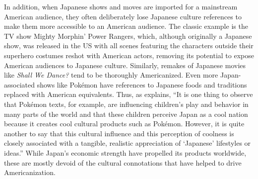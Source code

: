 \documentclass[12pt]{article}
\begin{document}
In addition, when Japanese shows and moves are imported for a mainstream American audience, they often deliberately lose Japanese culture references to make them more accessible to an American audience.  The classic example is the TV show Mighty Morphin' Power Rangers, which, although originally a Japanese show, was released in the US with all scenes featuring the characters outside their superhero costumes reshot with American actors, removing its potential to expose American audiences to Japanese culture.  Similarly, remakes of Japanese movies like \emph{Shall We Dance?} tend to be thoroughly Americanized.  Even more Japan-associated shows like Pok\'emon have references to Japanese foods and traditions replaced with American equivalents.  Thus, as \cRecentering{\citet[pg.\ 34]} explains, ``It is one thing to observe that Pok\'emon texts, for example, are influencing children's play and behavior in many parts of the world and that these children perceive Japan as a cool nation because it creates cool cultural products such as Pok\'emon.  However, it is quite another to say that this cultural influence and this perception of coolness is closely associated with a tangible, realistic appreciation of `Japanese' lifestyles or ideas.''  While Japan's economic strength have propelled its products worldwide, these are mostly devoid of the cultural connotations that have helped to drive Americanization.
\end{document}
